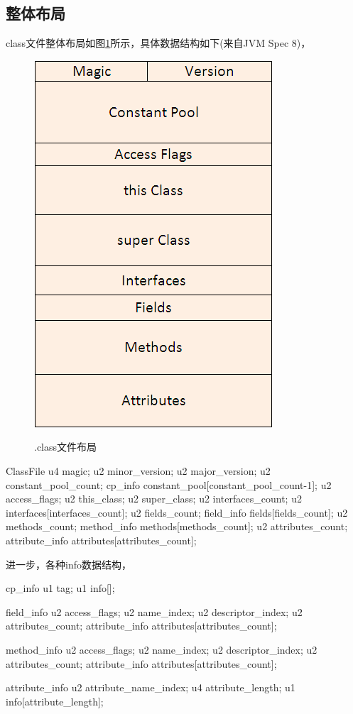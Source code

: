 \documentclass[a4paper,11pt]{article}
\begin{document}
\subsection[整体布局]{整体布局}
class文件整体布局如图\ref{fig:dotclass}所示，具体数据结构如下(来自JVM Spec 8)，

\begin{figure}
  \centering
  \includegraphics[width=.4\textwidth]{picturedir/JavaClassFileLayout.png}\\
  \caption{.class文件布局}\label{fig:dotclass}
\end{figure}

\begin{javacode}
ClassFile {
  u4 magic;
  u2 minor_version;
  u2 major_version;
  u2 constant_pool_count;
  cp_info constant_pool[constant_pool_count-1];
  u2 access_flags;
  u2 this_class;
  u2 super_class;
  u2 interfaces_count;
  u2 interfaces[interfaces_count];
  u2 fields_count;
  field_info fields[fields_count];
  u2 methods_count;
  method_info methods[methods_count];
  u2 attributes_count;
  attribute_info attributes[attributes_count];
}
\end{javacode}

进一步，各种info数据结构，

\begin{javacode}
cp_info {
  u1 tag;
  u1 info[];
}

field_info {
  u2 access_flags;
  u2 name_index;
  u2 descriptor_index;
  u2 attributes_count;
  attribute_info attributes[attributes_count];
}

method_info {
  u2 access_flags;
  u2 name_index;
  u2 descriptor_index;
  u2 attributes_count;
  attribute_info attributes[attributes_count];
}

attribute_info {
  u2 attribute_name_index;
  u4 attribute_length;
  u1 info[attribute_length];
}
\end{javacode}
\end{document}
